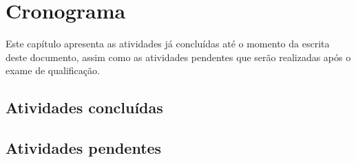 \chapter{Cronograma}
\label{cap:cronograma}

Este capítulo apresenta as atividades já concluídas até o momento da escrita deste documento, assim como as atividades pendentes que serão realizadas após o exame de qualificação.

\section{Atividades concluídas}


\section{Atividades pendentes}


